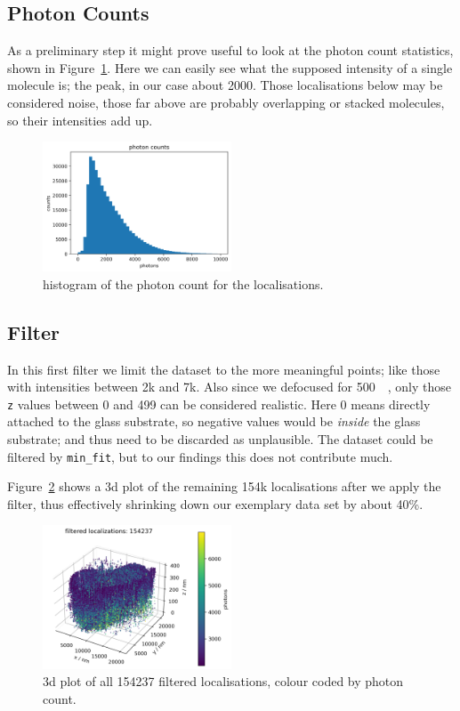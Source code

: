 \documentclass[11pt, a4paper, oneside, twocolumn]{report}
\renewcommand{\tt}{\texttt}
\newcommand{\e}{\emph}
\newcommand{\m}{\mathrm}
\begin{document}
\subsection{Photon Counts}

As a preliminary step it might prove useful to look at the photon
count statistics, shown in Figure~\ref{f:3_photons}. Here we can
easily see what the supposed intensity of a single molecule is; the
peak, in our case about 2000. Those localisations below may be
considered noise, those far above are probably overlapping or stacked
molecules, so their intensities add up.

\begin{figure}[h!]
  \centering
  \includegraphics[width=0.5\textwidth]{3_photons.png}
  \caption{histogram of the photon count for the localisations.}
  \label{f:3_photons}
\end{figure}


\subsection{Filter}

In this first filter we limit the dataset to the more meaningful
points; like those with intensities between 2k and 7k. Also since we
defocused for \SI{500}{\nano\m}, only those \tt{z} values between 0 and
499 can be considered realistic. Here 0 means directly attached to the
glass substrate, so negative values would be \e{inside} the glass
substrate; and thus need to be discarded as unplausible. The dataset
could be filtered by \tt{min\_fit}, but to our findings this does not
contribute much.

Figure~\ref{f:4_filter} shows a 3d plot of the remaining 154k
localisations after we apply the filter, thus effectively shrinking
down our exemplary data set by about 40\%.

\begin{figure}[h!]
  \centering
  \includegraphics[width=0.5\textwidth]{4_filter.png}
  \caption{3d plot of all 154237 filtered localisations, colour coded
    by photon count.}
  \label{f:4_filter}
\end{figure}
\end{document}
